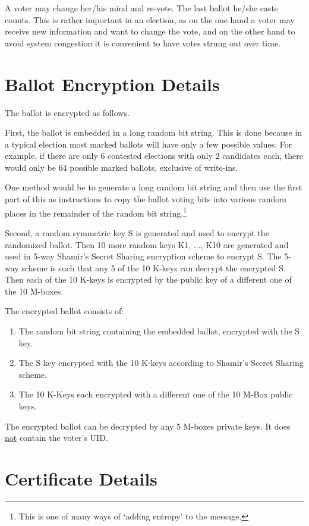 \documentclass[12pt]{article}
\begin{document}
A voter may change her/his mind and re-vote.  The last ballot
he/she casts counts.  This is rather important in an election,
as on the one hand a voter may receive new information and
want to change the vote, and on the other hand to avoid system
congestion it is convenient to have votes strung out over time.

\section{Ballot Encryption Details}

The ballot is encrypted as follows.

First, the ballot is embedded in a long random bit string.
This is done because in a typical election most marked ballots will
have only a few possible values.  For example, if there are only
6 contested elections with only 2 candidates each, there would only
be 64 possible marked ballots, exclusive of write-ins.

One method would be to generate a long random bit string and then
use the first part of this as instructions to copy the ballot voting bits into
various random places in the remainder of the random bit string.\footnote{
This is one of many ways of `adding entropy' to the message.}

Second, a random symmetric key S is generated and used to encrypt
the randomized ballot.  Then 10 more random keys K1, ..., K10 are generated
and used in 5-way Shamir's Secret Sharing encryption
scheme to encrypt S.  The 5-way
scheme is such that any 5 of the 10 K-keys can decrypt the encrypted S.
Then each of the 10 K-keys is encrypted by the public key
of a different one of the 10 M-boxes.

The encrypted ballot consists of:
\begin{enumerate}
\item The random bit string containing the embedded ballot,
      encrypted with the S key.
\item The S key encrypted with the 10 K-keys according to
      Shamir's Secret Sharing scheme.
\item The 10 K-Keys each encrypted with a
      different one of the 10 M-Box public keys.
\end{enumerate}
The encrypted ballot can be decrypted
by any 5 M-boxes private keys.
It does \underline{not} contain the voter's UID.

\section{Certificate Details}
\label{CERTIFICATE-DETAILS}
\end{document}
